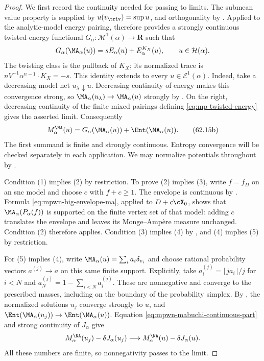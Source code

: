 \begin{proof}
We first record the continuity needed for passing to limits.
The submean value property is supplied by
$u(v_{\triv})=\sup u$, and orthogonality by
. Applied to the analytic-model
energy pairing, \cite[(4.2) and Proposition~4.5,
pp.~191--193]{BJ25FiniteEnergy} therefore provides a strongly
continuous twisted-energy functional
$G_\alpha:\mathcal M^1(\alpha)\to\mathbf R$ such that
\[
 G_\alpha(\MA_\alpha(u))
       =sE_\alpha(u)+E_\alpha^{K_X}(u),
       \qquad u\in\mathcal H(\alpha).
\]
The twisting class is the pullback of $K_X$; its normalized trace is
$nV^{-1}\alpha^{n-1}\cdot K_X=-s$.
This identity extends to every $u\in\mathcal E^1(\alpha)$.
Indeed, take a decreasing model net $u_\lambda\downarrow u$.
Decreasing continuity of energy makes this convergence strong,
so $\MA_\alpha(u_\lambda)\to\MA_\alpha(u)$ strongly by
. On the right, decreasing
continuity of the finite mixed pairings defining
\eqref{eq:mp-twisted-energy} gives the asserted limit.
Consequently
\[
 M_\alpha^{\NA}(u)
       =G_\alpha(\MA_\alpha(u))+\Ent(\MA_\alpha(u)).
\tag{62.15b}\label{eq:mpwn-mabuchi-continuous-part}
\]
The first summand is finite and strongly continuous. Entropy
convergence will be checked separately in each application.
We may normalize potentials throughout by
.

Condition (1) implies (2) by restriction. To prove (2) implies (3),
write $f=f_D$ on an snc model and choose $c$ with $f+c\geq1$.
The envelope is continuous by .
Formula \eqref{eq:mpwn-big-envelope-ma}, applied to $D+c\cX_0$,
shows that $\MA_\alpha(P_\alpha(f))$ is supported on the finite
vertex set of that model: adding $c$ translates the envelope and
leaves its Monge--Amp\`ere measure unchanged. Condition (2)
therefore applies. Condition (3) implies (4) by
, and (4) implies (5) by restriction.

For (5) implies (4), write $\MA_\alpha(u)=\sum_i a_i\delta_{v_i}$
and choose rational probability vectors $a^{(j)}\to a$ on this
same finite support. Explicitly, take
$a_i^{(j)}=\lfloor ja_i\rfloor/j$ for $i<N$ and
$a_N^{(j)}=1-\sum_{i<N}a_i^{(j)}$. These are nonnegative
and converge to the prescribed masses, including on the boundary
of the probability simplex. By ,
the normalized solutions $u_j$ converge strongly to $u$, and
$\Ent(\MA_\alpha(u_j))\to\Ent(\MA_\alpha(u))$.
Equation \eqref{eq:mpwn-mabuchi-continuous-part} and strong
continuity of $J_\alpha$ give
\[
 M_\alpha^{\NA}(u_j)-\delta J_\alpha(u_j)
       \longrightarrow M_\alpha^{\NA}(u)-\delta J_\alpha(u).
\]
All these numbers are finite, so nonnegativity passes to the limit.


\end{proof}
